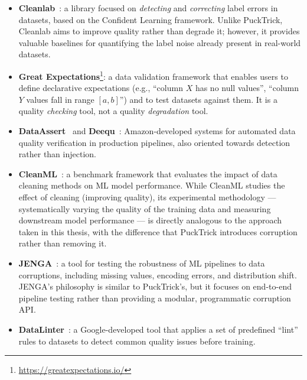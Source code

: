 \begin{itemize}
    \item \textbf{Cleanlab}~\cite{northcutt2021confident}: a library focused on
          \emph{detecting} and \emph{correcting} label errors in datasets, based
          on the Confident Learning framework.  Unlike PuckTrick, Cleanlab aims
          to improve quality rather than degrade it; however, it provides
          valuable baselines for quantifying the label noise already present in
          real-world datasets.

    \item \textbf{Great Expectations}\footnote{\url{https://greatexpectations.io/}}:
          a data validation framework that enables users to define declarative
          expectations (e.g., ``column $X$ has no null values'', ``column $Y$
          values fall in range $[a, b]$'') and to test datasets against them.
          It is a quality \emph{checking} tool, not a quality
          \emph{degradation} tool.

    \item \textbf{DataAssert}~\cite{schelter2018automating} and
          \textbf{Deequ}~\cite{schelter2018deequ}: Amazon-developed systems
          for automated data quality verification in production pipelines,
          also oriented towards detection rather than injection.

    \item \textbf{CleanML}~\cite{li2021cleanml}: a benchmark framework that
          evaluates the impact of data cleaning methods on ML model
          performance.  While CleanML studies the effect of cleaning (improving
          quality), its experimental methodology — systematically varying the
          quality of the training data and measuring downstream model
          performance — is directly analogous to the approach taken in this
          thesis, with the difference that PuckTrick introduces corruption
          rather than removing it.

    \item \textbf{JENGA}~\cite{schelter2021jenga}: a tool for testing the
          robustness of ML pipelines to data corruptions, including missing
          values, encoding errors, and distribution shift.  JENGA's philosophy
          is similar to PuckTrick's, but it focuses on end-to-end pipeline
          testing rather than providing a modular, programmatic corruption API.

    \item \textbf{DataLinter}~\cite{hynes2017datalinter}: a Google-developed
          tool that applies a set of predefined ``lint'' rules to datasets to
          detect common quality issues before training.
\end{itemize}

